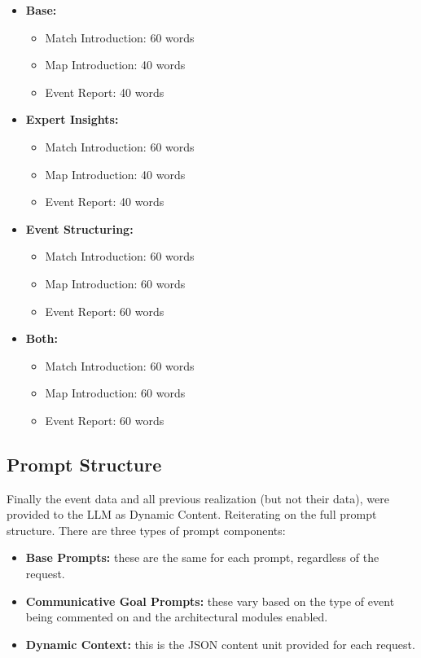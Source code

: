 \begin{itemize}
  \item \textbf{Base:}
    \begin{itemize}
      \item Match Introduction: 60 words
      \item Map Introduction: 40 words
      \item Event Report: 40 words
    \end{itemize}
  \item \textbf{Expert Insights:}
    \begin{itemize}
      \item Match Introduction: 60 words
      \item Map Introduction: 40 words
      \item Event Report: 40 words
    \end{itemize}
  \item \textbf{Event Structuring:}
    \begin{itemize}
      \item Match Introduction: 60 words
      \item Map Introduction: 60 words
      \item Event Report: 60 words
    \end{itemize}
  \item \textbf{Both:}
    \begin{itemize}
      \item Match Introduction: 60 words
      \item Map Introduction: 60 words
      \item Event Report: 60 words
    \end{itemize}
\end{itemize}

\subsection{Prompt Structure}
Finally the event data and all previous realization (but not their data), were provided to the LLM as Dynamic Content.
Reiterating on the full prompt structure. There are three types of prompt components:

\begin{itemize}
  \item \textbf{Base Prompts: }these are the same for each prompt, regardless of the request.
  \item \textbf{Communicative Goal Prompts: }these vary based on the type of event being commented on and the architectural modules enabled.
  \item \textbf{Dynamic Context: }this is the JSON content unit provided for each request.
\end{itemize}


